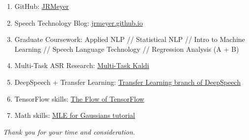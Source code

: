 \documentclass[12pt,a4paper]{article}
\begin{document}
\begin{enumerate}

\item GitHub: \href{https://github.com/JRMeyer}{JRMeyer}
    
\item Speech Technology Blog: \href{http://jrmeyer.github.io}{jrmeyer.github.io}

\item Graduate Coursework: Applied NLP // Statistical NLP // Intro to Machine Learning // Speech Language Technology // Regression Analysis (A + B)
  
\item Multi-Task ASR Research: \href{https://github.com/JRMeyer/multi-task-kaldi}{Multi-Task Kaldi}
  
\item DeepSpeech + Transfer Learning: \href{https://github.com/mozilla/DeepSpeech/tree/transfer-learning}{Transfer Learning branch of DeepSpeech}
  
\item TensorFlow skills: \href{http://jrmeyer.github.io/machinelearning/2016/02/01/TensorFlow-Tutorial.html}{The Flow of TensorFlow}
  
\item Math skills: \href{http://jrmeyer.github.io/machinelearning/2017/08/18/mle.html}{MLE for Gaussians tutorial}
  
\end{enumerate}

\vspace{1cm}

\begin{center}
\textit{Thank you for your time and consideration.}  
\end{center}
\end{document}
